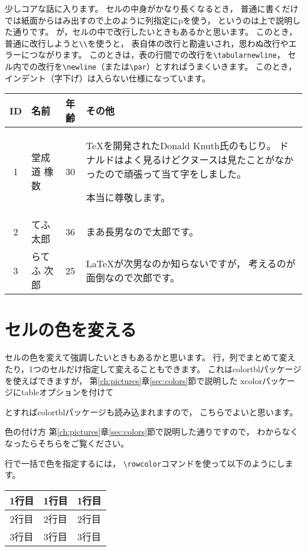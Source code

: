 \documentclass[class=jreport, crop=false, preview=false, dvipdfmx, fleqn]{standalone}
\begin{document}
少しコアな話に入ります。
セルの中身がかなり長くなるとき，
普通に書くだけでは紙面からはみ出すので上のように列指定にpを使う，
というのは上で説明した通りです。
が，セルの中で改行したいときもあるかと思います。
このとき，普通に改行しようと\verb|\\|を使うと，
表自体の改行と勘違いされ，思わぬ改行やエラーにつながります。
このときは，表の行間での改行を\verb|\tabularnewline|，
セル内での改行を\verb|\newline|（または\verb|\par|）とすればうまくいきます。
このとき，インデント（字下げ）は入らない仕様になっています。

\begin{IOTeX*}
\begin{tabular}{|c|l|c|p{}|} \hline
ID & 名前 & 年齢 & その他 \tabularnewline \hline
1 & 堂成道 橡数 & 30 &
{\TeX}を開発されたDonald Knuth氏のもじり。\newline
ドナルドはよく見るけどクヌースは見たことがなかったので頑張って当て字をしました。\par
本当に尊敬します。
\tabularnewline \hline
2 & てふ 太郎 & 36 &
まあ長男なので太郎です。
\tabularnewline \hline
3 & らてふ 次郎 & 25 &
{\LaTeX}が次男なのか知らないですが，
考えるのが面倒なので次郎です。
\tabularnewline \hline
\end{tabular}
\end{IOTeX*}





\section{セルの色を変える}
セルの色を変えて強調したいときもあるかと思います。
行，列でまとめて変えたり，1つのセルだけ指定して変えることもできます。
これはcolortblパッケージを使えばできますが，
第\ref{ch:pictures}章\ref{sec:colors}節で説明した
xcolorパッケージにtableオプションを付けて
\begin{ITeX}
\usepackage[table]{xcolor}
\end{ITeX}
とすればcolortblパッケージも読み込まれますので，
こちらでよいと思います。

色の付け方
第\ref{ch:pictures}章\ref{sec:colors}節で説明した通りですので，
わからなくなったらそちらをご覧ください。

行で一括で色を指定するには，
\verb|\rowcolor|コマンドを使って以下のようにします。
\begin{IOTeX}
\begin{tabular}{|c|c|c|} \hline
\rowcolor{red} 1行目 & 1行目 & 1行目 \\ \hline
\rowcolor{orange} 2行目 & 2行目 & 2行目 \\ \hline
3行目 & 3行目 & 3行目 \\ \hline
\end{tabular}
\end{IOTeX}
\end{document}
